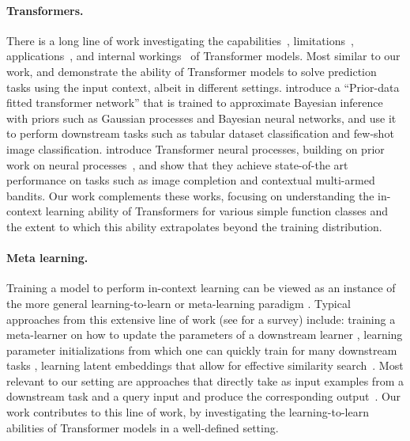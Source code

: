 \documentclass{article}
\begin{document}
\paragraph{Transformers.} There is a long line of work investigating the capabilities~\citep{vaswani2017attention,dehghani2018universal,yun2019transformers,perez2019turing,yao2021self,bhattamishra2020computational,zhang2022unveiling}, limitations~\citep{hahn2020theoretical, bhattamishra2020ability}, applications~\citep{lu2021pretrained,dosovitskiy2020image, parmar2018image}, and internal workings~\citep{elhage2021mathematical,snell2021approximating,weiss2021thinking,edelman2022inductive,olsson2022context} of Transformer models.
Most similar to our work, \citet{muller2021transformers} and \citet{nguyen2022transformer} demonstrate the ability of Transformer models to solve prediction tasks using the input context, albeit in different settings. \citet{muller2021transformers} introduce a ``Prior-data fitted transformer network'' that is trained to approximate Bayesian inference with priors such as Gaussian processes and Bayesian neural networks,  and use it to perform downstream tasks such as tabular dataset classification and few-shot image classification. \citet{nguyen2022transformer} introduce Transformer neural processes, building on prior work on neural processes~\citep{garnelo2018neural, garnelo2018conditional, kim2019attentive}, and show that they achieve state-of-the art performance on tasks such as image completion and contextual multi-armed bandits.
Our work complements these works, focusing on understanding the in-context learning ability of Transformers for various simple function classes and the extent to which this ability extrapolates beyond the training distribution.

\paragraph{Meta learning.} Training a model to perform in-context learning
can be viewed as an instance of the more general learning-to-learn or meta-learning paradigm \citep{schmidhuber1987evolutionary,naik1992meta,thrun2012learning}.
Typical approaches from this extensive line of work (see \citep{hospedales2020meta} for a survey) include:
training a meta-learner on how to update the parameters of a downstream learner \citep{bengio1995optimization, li2016learning}, learning parameter initializations from which one can quickly train for many downstream tasks \citep{finn2017model, ravi2016optimization},
learning latent embeddings that allow for effective similarity search~\citep{snell2017prototypical}.
Most relevant to our setting are approaches that directly  take as input examples from a downstream task and a query input and produce the corresponding output~\citep{hochreiter2001learning,mishra2018simple, santoro2016meta, garnelo2018neural, garnelo2018conditional,kirsch2021meta}.
Our work contributes to this line of work, by investigating the learning-to-learn abilities of Transformer models in a well-defined setting.
\end{document}
